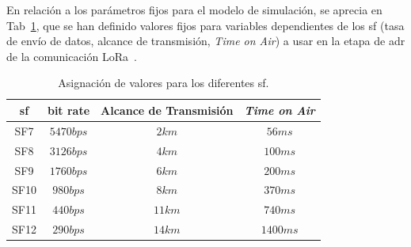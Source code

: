 \begin{justify}
\begin{itemize}
\end{itemize}
\noindent
En relación a los parámetros fijos para el modelo de simulación, se aprecia en Tab~\ref{tab:par}, que se han definido valores fijos para variables dependientes de los \gls{sf} (tasa de envío de datos, alcance de transmisión, \textit{Time on Air}) a usar en la etapa de \gls{adr} de la comunicación LoRa~\cite{orange}.
\begin{table}[!ht]
\centering
\begin{tabular}{|c|c|c|c|}
\hline
\gls{sf} & bit rate & Alcance de Transmisión & \textit{Time on Air}\\ \hline
SF7 & $5470bps$ & $2km$ & $56ms$ \\ \hline
SF8 & $3126bps$ & $4km$ & $100ms$ \\ \hline
SF9 & $1760bps$ & $6km$ & $200ms$ \\ \hline
SF10 & $980bps$ & $8km$ & $370ms$ \\ \hline
SF11 & $440bps$ & $11km$ & $740ms$ \\ \hline
SF12 & $290bps$ & $14km$ & $1400ms$ \\ 
\hline
\end{tabular}
\caption{Asignación de valores para los diferentes \gls{sf}.}
\label{tab:par}
\end{table}

\end{justify}
